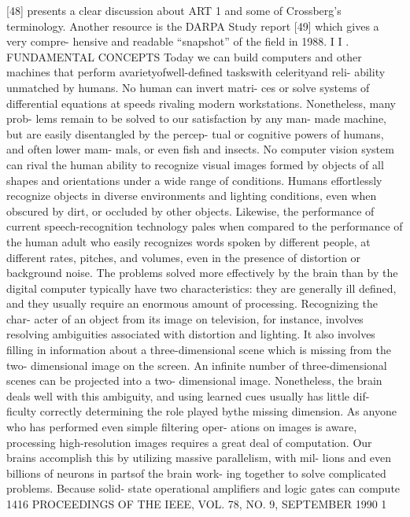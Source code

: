 {[}48{]} presents a clear discussion about ART 1 and some of Crossberg's
terminology. Another resource is the DARPA Study report {[}49{]} which
gives a very compre- hensive and readable ``snapshot'' of the field in
1988. I I .\\
FUNDAMENTAL CONCEPTS Today we can build computers and other machines
that perform avarietyofwell-defined taskswith celerityand reli- ability
unmatched by humans. No human can invert matri- ces or solve systems of
differential equations at speeds rivaling modern workstations.
Nonetheless, many prob- lems remain to be solved to our satisfaction by
any man- made machine, but are easily disentangled by the percep- tual
or cognitive powers of humans, and often lower mam- mals, or even fish
and insects. No computer vision system can rival the human ability to
recognize visual images formed by objects of all shapes and orientations
under a wide range of conditions. Humans effortlessly recognize objects
in diverse environments and lighting conditions, even when obscured by
dirt, or occluded by other objects. Likewise, the performance of current
speech-recognition technology pales when compared to the performance of
the human adult who easily recognizes words spoken by different people,
at different rates, pitches, and volumes, even in the presence of
distortion or background noise. The problems solved more effectively by
the brain than by the digital computer typically have two
characteristics: they are generally ill defined, and they usually
require an enormous amount of processing. Recognizing the char- acter of
an object from its image on television, for instance, involves resolving
ambiguities associated with distortion and lighting. It also involves
filling in information about a three-dimensional scene which is missing
from the two- dimensional image on the screen. An infinite number of
three-dimensional scenes can be projected into a two- dimensional image.
Nonetheless, the brain deals well with this ambiguity, and using learned
cues usually has little dif- ficulty correctly determining the role
played bythe missing dimension. As anyone who has performed even simple
filtering oper- ations on images is aware, processing high-resolution
images requires a great deal of computation. Our brains accomplish this
by utilizing massive parallelism, with mil- lions and even billions of
neurons in partsof the brain work- ing together to solve complicated
problems. Because solid- state operational amplifiers and logic gates
can compute 1416 PROCEEDINGS OF THE IEEE, VOL. 78, NO. 9, SEPTEMBER 1990
1

